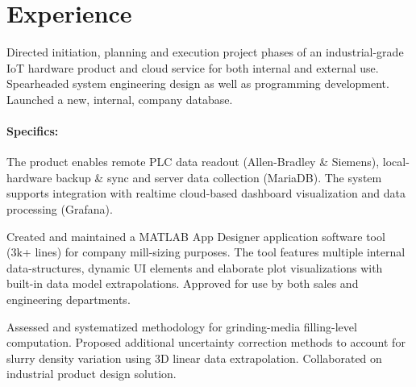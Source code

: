 \documentclass[]{plushcv}
\begin{document}
\thispagestyle{empty}

\vspace*{1cm}
\begin{minipage}[t]{0.70\textwidth} 

\section{Experience}
	\vspace{\topsep} %
	\begin{tightemize}
		\item Directed initiation, planning and execution project phases of an industrial-grade IoT hardware product and cloud service for both internal and external use. Spearheaded system engineering design as well as programming development. Launched a new, internal, company database.
		\paragraph{Specifics:}\vspace*{-12pt}
		The product enables remote PLC data readout (Allen-Bradley \& Siemens), local-hardware backup \& sync and server data collection (MariaDB). The system supports integration with realtime cloud-based dashboard visualization and data processing (Grafana).
		\item Created and maintained a MATLAB App Designer application software tool (3k+ lines) for company mill-sizing purposes. The tool features multiple internal data-structures, dynamic UI elements and elaborate plot visualizations with built-in data model extrapolations. Approved for use by both sales and engineering departments.
		\item Assessed and systematized methodology for grinding-media filling-level computation. Proposed additional uncertainty correction methods to account for slurry density variation using 3D linear data extrapolation. Collaborated on industrial product design solution.
	\end{tightemize}
	\subskip
	

\end{minipage}
\end{document}
